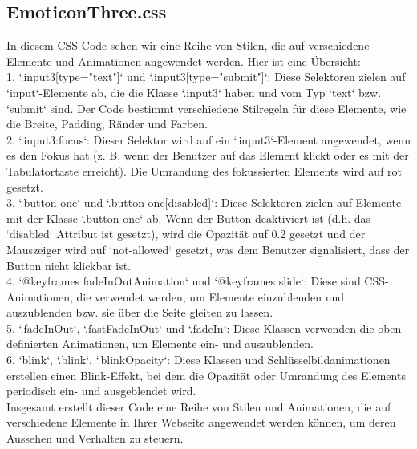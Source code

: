 \documentclass[./dokumentation.tex]{subfiles}
\begin{document}
\subsection{EmoticonThree.css}
In diesem CSS-Code sehen wir eine Reihe von Stilen, die auf verschiedene Elemente und Animationen angewendet werden. Hier ist eine Übersicht:\\
1. `.input3[type="text"]` und `.input3[type="submit"]`: Diese Selektoren zielen auf `input`-Elemente ab, die die Klasse `.input3` haben und vom Typ `text` bzw. `submit` sind. Der Code bestimmt verschiedene Stilregeln für diese Elemente, wie die Breite, Padding, Ränder und Farben.\\
2. `.input3:focus`: Dieser Selektor wird auf ein `.input3`-Element angewendet, wenn es den Fokus hat (z. B. wenn der Benutzer auf das Element klickt oder es mit der Tabulatortaste erreicht). Die Umrandung des fokussierten Elements wird auf rot gesetzt.\\
3. `.button-one` und `.button-one[disabled]`: Diese Selektoren zielen auf Elemente mit der Klasse `.button-one` ab. Wenn der Button deaktiviert ist (d.h. das `disabled` Attribut ist gesetzt), wird die Opazität auf 0.2 gesetzt und der Mauszeiger wird auf `not-allowed` gesetzt, was dem Benutzer signalisiert, dass der Button nicht klickbar ist.\\
4. `@keyframes fadeInOutAnimation` und `@keyframes slide`: Diese sind CSS-Animationen, die verwendet werden, um Elemente einzublenden und auszublenden bzw. sie über die Seite gleiten zu lassen.\\
5. `.fadeInOut`, `.fastFadeInOut` und `.fadeIn`: Diese Klassen verwenden die oben definierten Animationen, um Elemente ein- und auszublenden.\\
6. `blink`, `.blink`, `.blinkOpacity`: Diese Klassen und Schlüsselbildanimationen erstellen einen Blink-Effekt, bei dem die Opazität oder Umrandung des Elements periodisch ein- und ausgeblendet wird.\\
Insgesamt erstellt dieser Code eine Reihe von Stilen und Animationen, die auf verschiedene Elemente in Ihrer Webseite angewendet werden können, um deren Aussehen und Verhalten zu steuern.
\end{document}
